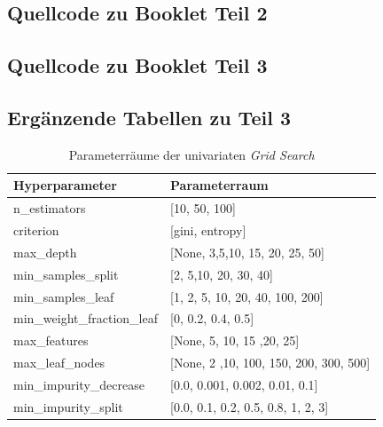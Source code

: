 \subsection{Quellcode zu Booklet Teil 2} \label{app:quellcode_booklet_2}
\pagebreak
\subsection{Quellcode zu Booklet Teil 3}
\subsection{Ergänzende Tabellen zu Teil 3}

\begin{table}[h]
	\centering
	\begin{tabular}{ll}
		\hline
		Hyperparameter              & Parameterraum                              \\ \hline
		n\_estimators               & {[}10, 50, 100{]}                          \\
		criterion                   & {[}gini, entropy{]}                    \\
		max\_depth                  & {[}None, 3,5,10, 15, 20, 25, 50{]}         \\
		min\_samples\_split         & {[}2, 5,10, 20, 30, 40{]}                  \\
		min\_samples\_leaf          & {[}1, 2, 5, 10, 20, 40, 100, 200{]}                  \\
		min\_weight\_fraction\_leaf & {[}0, 0.2, 0.4, 0.5{]}                     \\
		max\_features               & {[}None, 5, 10, 15 ,20, 25{]}              \\
		max\_leaf\_nodes            & {[}None, 2 ,10, 100, 150, 200, 300, 500{]} \\
		min\_impurity\_decrease     & {[}0.0, 0.001, 0.002, 0.01, 0.1{]}     \\
		min\_impurity\_split        & {[}0.0, 0.1, 0.2, 0.5, 0.8, 1, 2, 3{]}     \\ \hline
	\end{tabular}
	\caption{\label{table:parameter_grid_univariat} Parameterräume der univariaten \emph{Grid Search}}
\end{table}

